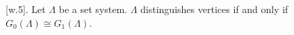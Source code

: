 [w.5]. Let $\Lambda$ be a set system. $\Lambda$ distinguishes vertices if and only if $G_0(\Lambda) \cong G_1(\Lambda)$.
